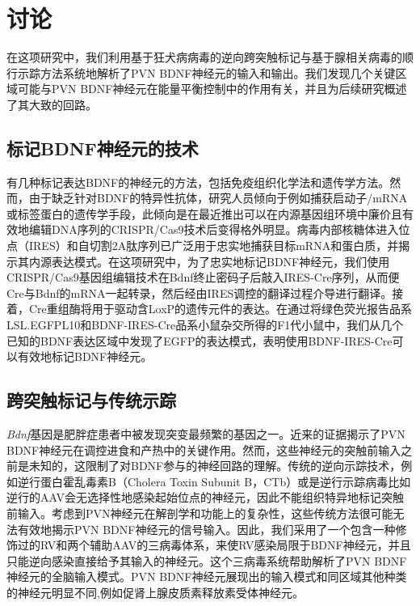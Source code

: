 \chapter{讨论}\label{chap:discussion}
在这项研究中，我们利用基于狂犬病病毒的逆向跨突触标记与基于腺相关病毒的顺行示踪方法系统地解析了PVN BDNF神经元的输入和输出。我们发现几个关键区域可能与PVN BDNF神经元在能量平衡控制中的作用有关，并且为后续研究概述了其大致的回路。

\section{标记BDNF神经元的技术}
有几种标记表达BDNF的神经元的方法，包括免疫组织化学法和遗传学方法。然而，由于缺乏针对BDNF的特异性抗体，研究人员倾向于例如捕获启动子/mRNA或标签蛋白的遗传学手段，此倾向是在最近推出可以在内源基因组环境中廉价且有效地编辑DNA序列的CRISPR/Cas9技术后\citep{ran2013genome, doudna2014new}变得格外明显。病毒内部核糖体进入位点（IRES）和自切割2A肽序列已广泛用于忠实地捕获目标mRNA和蛋白质，并揭示其内源表达模式\citep{vong2011leptin, daigle2018suite}。在这项研究中，为了忠实地标记BDNF神经元，我们使用CRISPR/Cas9基因组编辑技术在Bdnf终止密码子后敲入IRES-Cre序列，从而便Cre与Bdnf的mRNA一起转录，然后经由IRES调控的翻译过程介导进行翻译。接着，Cre重组酶将用于驱动含LoxP的遗传元件的表达。在通过将绿色荧光报告品系LSL.EGFPL10和BDNF-IRES-Cre品系小鼠杂交所得的F1代小鼠中，我们从几个已知的BDNF表达区域中发现了EGFP的表达模式，表明使用BDNF-IRES-Cre可以有效地标记BDNF神经元。

\section{跨突触标记与传统示踪}
\textit{Bdnf}基因是肥胖症患者中被发现突变最频繁的基因之一。近来的证据揭示了PVN BDNF神经元在调控进食和产热中的关键作用。然而，这些神经元的突触前输入之前是未知的，这限制了对BDNF参与的神经回路的理解。传统的逆向示踪技术，例如逆行蛋白霍乱毒素B（Cholera Toxin Subunit B，CTb）\citep{conte2009multiple}或是逆行示踪病毒比如逆行的AAV\citep{tervo2016designer}会无选择性地感染起始位点的神经元，因此不能组织特异地标记突触前输入。考虑到PVN神经元在解剖学和功能上的复杂性，这些传统方法很可能无法有效地揭示PVN BDNF神经元的信号输入。因此，我们采用了一个包含一种修饰过的RV和两个辅助AAV的三病毒体系，来使RV感染局限于BDNF神经元，并且只能逆向感染直接给予其输入的神经元。这个三病毒系统帮助解析了PVN BDNF神经元的全脑输入模式。PVN BDNF神经元展现出的输入模式和同区域其他种类的神经元明显不同,例如促肾上腺皮质素释放素受体神经元\citep{jiang2018local}。

